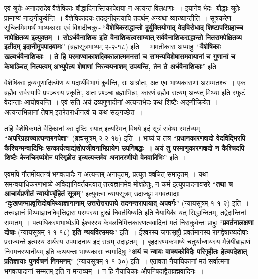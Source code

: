{एवं श्रुतेः अनादरादेव वैशेषिकाः बौद्धादिनास्तिकापेक्षया न अत्यन्तं विलक्षणाः~। इयानेव भेदः- बौद्धाः श्रुतेः प्रामाण्यं नाङ्गीकुर्वन्ति~। वैशेषिकादयः तदङ्गीकृत्यापि तदर्थम् अन्यथा व्याख्यान्तीति~। सूत्रकरेण सूचितमिममर्थं भाष्यकाराः एवं विशदीचक्रुः- “\textbf{वैशेषिकराद्धान्तो दुर्युक्तियोगाद् वेदविरोधाद् शिष्टापरिग्रहाच्च नापेक्षितव्य इत्युक्तम्~। सोऽर्धवैनाशिक इति वैनाशिकत्वसाम्यात् सर्ववैनाशिकराद्धान्तो नितरामपेक्षितव्य इतीदम् इदानीमुपपादयामः}” (ब्रह्मसूत्रभाष्यम् २-२-१८) इति~। भामतीकारा अप्याहुः “\textbf{वैशेषिकाः खल्वर्धवैनाशिकाः~। ते हि परमाण्वाकाशदिक्कालात्ममनसां च सामन्यविशेषासमवायानां च गुणानां च केषाञ्चित् नित्यत्वम् अभ्युपेत्य शेषाणां निरन्वयनाशम् उपयन्ति, तेन ते अर्धवैनाशिकाः}” इति~। 

वैशेषिकाः द्रव्यगुणादिरूपेण यं पदार्थविभागं कुर्वन्ति, सः अश्रौतः, अत एव भाष्यकाराणां असम्मतश्च~। एकं ब्रह्मैव सर्वस्यापि प्रपञ्चस्य प्रकृतिः, अतः प्रपञ्चः ब्रह्माभिन्नः, कारणं ब्रह्मैव सत्यम् अन्यत् मिथ्या इति स्फुटं वेदान्ताः आघोषयन्ति~। एवं सति अयं द्रव्यगुणादीनां अत्यन्तभेदः कथं शिष्टैः अङ्गीक्रियेत~। अत्यन्तभिन्नानां तेषाम् इतरेतराधीनत्वं च कथं सङ्गच्छेत~। 

तर्हि वैशेषिकमते वैदिकानां का दृष्टिः स्यात् इत्यस्मिन् विषये इदं सूत्रं सर्वथा स्मर्तव्यम् “\textbf{अपरिग्रहाच्चात्यन्तमनपेक्षा}” (ब्रह्मसूत्रम् २-२-१७) इति~। भाष्यं च तत्र “\textbf{प्रधान\-कारणवादो वेदविद्भिरपि कैश्चिन्मन्वादिभिः सत्कार्यत्वाद्यंशोपजीवनाभिप्रायेण उपनिबद्धः~। अयं तु परमाणुकारणवादो न कैश्चिदपि शिष्टैः केनचिदप्यंशेन परिगृहीत इत्यत्यन्तमेव अनादरणीयो वेदवादिभिः}” इति~। 

एवमपि गौतमीयतन्त्रं भगवत्पादैः न अत्यन्तम् अनादृतम्, प्रत्युत क्वचित् समादृतम्~। यथा समन्वयाधिकरणभाष्ये अविद्यानिवर्तकत्वात् तत्त्वज्ञानमेव मोक्षहेतुः, न कर्म इत्युपपादनावसरे “\textbf{तथा च आचार्यप्रणीतं न्यायोपबृंहितं सूत्रम्}” इत्युक्त्वा न्यायसूत्रम् उदाजह्रुः भगवत्पादाः “\textbf{दुःखजन्मप्रवृत्तिदोषमिथ्याज्ञानानाम् उत्तरोत्तरापाये तदनन्तरापायात् अपवर्गः}” (न्यायसूत्रम् १-१-२) इति~। तत्त्वज्ञानं मिथ्याज्ञाननिवृत्तिद्वारा परम्परया दुःखं निवर्तयिष्यति इति नैयायिकैः यत् सिद्धान्तितम्, तद्वेदान्तिनां सम्मतम्~। पत्यधिकरणभाष्येऽपि ईश्वरस्य केवलनिमित्तकारणत्ववादिनां मतं निराकुर्वन्तः प्राहुः “\textbf{प्रवर्तनालक्षणा दोषाः} (न्यायसूत्रम् १-१-१८) \textbf{इति न्ययवित्समयः}” इति~। ईश्वरस्य जगत्सृष्ट्रौ प्रवर्तमानस्य रागद्वेषाख्यदोषाः प्रसज्यन्ते इत्यस्य अर्थस्य उपपादनाय इदं सत्रम् उदाहृतम्~। बृहदारण्यकभाष्ये चतुर्थाध्यायस्य मैत्रेयीब्राह्मणं निगमनस्थानीयम् इति कथयन्तः भाष्यकाराः न्यगादिषुः “\textbf{अयं च न्यायः वाक्यकोविदैः परिगृहीतः हेत्वपदेशात् प्रतिज्ञायाः पुनर्वचनं निगमनम्}” (न्यायसूत्रम् १-१-३०) इति~। एतावता नैयायिकानां मतं सर्वात्मना भगवत्पादानां सम्मतम् इति न मन्तव्यम्~। न हि नैयायिकाः औपनिषदाद्वैतब्रह्मवादिनः~। 

}
